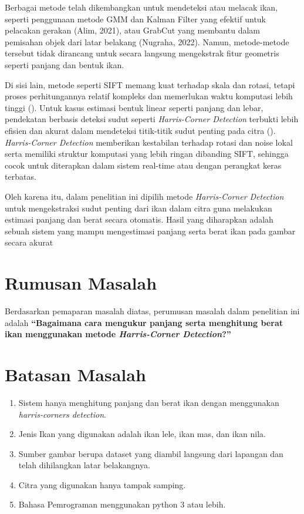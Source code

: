 Berbagai metode telah dikembangkan untuk mendeteksi atau melacak ikan, seperti penggunaan metode GMM dan Kalman Filter yang efektif untuk pelacakan gerakan (Alim, 2021), atau GrabCut yang membantu dalam pemisahan objek dari latar belakang (Nugraha, 2022). 
Namun, metode-metode tersebut tidak dirancang untuk secara langsung mengekstrak fitur geometris seperti panjang dan bentuk ikan.

Di sisi lain, metode seperti SIFT memang kuat terhadap skala dan rotasi, tetapi proses perhitungannya relatif kompleks dan memerlukan waktu komputasi lebih tinggi (\cite{Lowe2004}). 
Untuk kasus estimasi bentuk linear seperti panjang dan lebar, pendekatan berbasis deteksi sudut seperti \emph{Harris-Corner Detection} terbukti lebih efisien dan akurat dalam mendeteksi titik-titik sudut penting pada citra (\cite{Harris2013}). 
\emph{Harris-Corner Detection} memberikan kestabilan terhadap rotasi dan noise lokal serta memiliki struktur komputasi yang lebih ringan dibanding SIFT, sehingga cocok untuk diterapkan dalam sistem real-time atau dengan perangkat keras terbatas.

Oleh karena itu, dalam penelitian ini dipilih metode \emph{Harris-Corner Detection} untuk mengekstraksi sudut penting dari ikan dalam citra guna melakukan estimasi panjang dan berat secara otomatis. 
Hasil yang diharapkan adalah sebuah sistem yang mampu mengestimasi panjang serta berat ikan pada gambar secara akurat


\section{Rumusan Masalah}
Berdasarkan pemaparan masalah diatas, perumusan masalah dalam penelitian ini adalah \textbf{“Bagaimana cara mengukur panjang serta menghitung berat ikan menggunakan metode \emph{Harris-Corner Detection}?”}

\section{Batasan Masalah}
\begin{enumerate}
	\item Sistem hanya menghitung panjang dan berat ikan dengan menggunakan \emph{harris-corners detection}. 
	\item Jenis Ikan yang digunakan adalah ikan lele, ikan mas, dan ikan nila.
	\item Sumber gambar berupa dataset yang diambil langsung dari lapangan dan telah dihilangkan latar belakangnya.
	\item Citra yang digunakan hanya tampak samping. 
	\item Bahasa Pemrograman menggunakan python 3 atau lebih. 
\end{enumerate}
	

